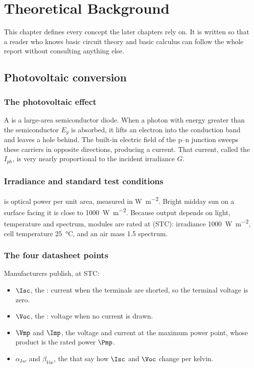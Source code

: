 \chapter{Theoretical Background}
\label{ch:theory}

This chapter defines every concept the later chapters rely on. It is written so
that a reader who knows basic circuit theory and basic calculus can follow the
whole report without consulting anything else.

\section{Photovoltaic conversion}

\subsection{The photovoltaic effect}

A  is a large-area semiconductor diode. When a photon with
energy greater than the semiconductor  $E_g$ is absorbed, it lifts
an electron into the conduction band and leaves a hole behind. The built-in
electric field of the p--n junction sweeps these carriers in opposite
directions, producing a current. That current, called the 
$I_{ph}$, is very nearly proportional to the incident irradiance $G$.

\subsection{Irradiance and standard test conditions}

 is optical power per unit area, measured in
\si{\watt\per\square\metre}. Bright midday sun on a surface facing it is close
to \SI{1000}{\watt\per\square\metre}. Because output depends on light,
temperature and spectrum, modules are rated at 
(STC): irradiance \SI{1000}{\watt\per\square\metre}, cell temperature
\SI{25}{\celsius}, and an air mass 1.5 spectrum.

\subsection{The four datasheet points}

Manufacturers publish, at STC:

\begin{itemize}[leftmargin=1.4em]
  \item $\Isc$, the : current when the terminals are
        shorted, so the terminal voltage is zero.
  \item $\Voc$, the : voltage when no current is
        drawn.
  \item $\Vmp$ and $\Imp$, the voltage and current at the maximum power point,
        whose product is the rated power $\Pmp$.
  \item $\alpha_{Isc}$ and $\beta_{Voc}$, the 
        that say how $\Isc$ and $\Voc$ change per kelvin.
\end{itemize}

